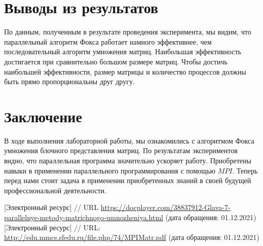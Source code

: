 \documentclass{report}
\begin{document}
\section*{Выводы из результатов}
\par По данным, полученным в результате проведения эксперимента, мы видим, что параллельный алгоритм Фокса работает намного эффективнее, чем последовательный алгоритм умножения матриц. Наибольшая эффективность достигается при
сравнительно большом размере матриц. Чтобы достичь наибольшей эффективности, размер матрицы и количество процессов должны быть прямо пропорциональны друг другу.
\newpage

\section*{Заключение}
В ходе выполнения лабораторной работы, мы ознакомились с алгоритмом Фокса умножения блочного представления матриц. По результатам экспериментов видно, что параллельная программа значительно ускоряет работу. Приобретены навыки в применении параллельного программирования с помощью {\itshape $MPI$}. Теперь перед нами стоит задача в применении приобретенных знаний в своей будущей профессиональной деятельности.
\newpage

\begin{thebibliography}{1}
 [Электронный ресурс] // URL \url {https://docplayer.com/38837912-Glava-7-parallelnye-metody-matrichnogo-umnozheniya.html} (дата обращения: 01.12.2021)
 [Электронный ресурс] // URL: \url {http://edu.mmcs.sfedu.ru/file.php/74/MPIMatr.pdf} (дата обращения: 01.12.2021)
\end{thebibliography}
\newpage

\end{document}
